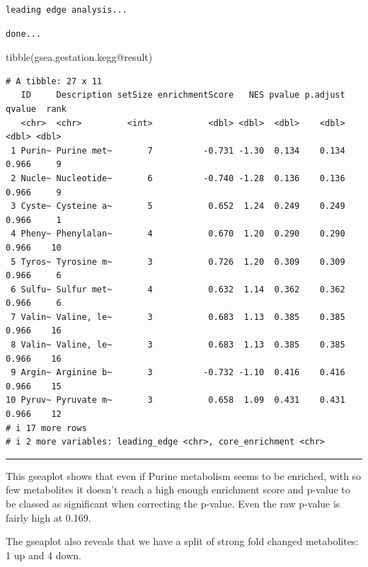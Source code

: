\documentclass[
  24px,
  letterpaper,
  DIV=11,
  numbers=noendperiod]{scrartcl}
\newenvironment{Shaded}{\begin{snugshade}}{\end{snugshade}}
\newcommand{\AttributeTok}[1]{\textcolor[rgb]{0.40,0.45,0.13}{#1}}
\newcommand{\DecValTok}[1]{\textcolor[rgb]{0.68,0.00,0.00}{#1}}
\newcommand{\FunctionTok}[1]{\textcolor[rgb]{0.28,0.35,0.67}{#1}}
\newcommand{\NormalTok}[1]{\textcolor[rgb]{0.00,0.23,0.31}{#1}}
\newcommand{\SpecialCharTok}[1]{\textcolor[rgb]{0.37,0.37,0.37}{#1}}
\begin{document}
\begin{verbatim}
leading edge analysis...
\end{verbatim}

\begin{verbatim}
done...
\end{verbatim}

\begin{Shaded}
\begin{Highlighting}[]
\FunctionTok{tibble}\NormalTok{(gsea.gestation.kegg}\SpecialCharTok{@}\NormalTok{result)}
\end{Highlighting}
\end{Shaded}

\begin{verbatim}
# A tibble: 27 x 11
   ID     Description setSize enrichmentScore   NES pvalue p.adjust qvalue  rank
   <chr>  <chr>         <int>           <dbl> <dbl>  <dbl>    <dbl>  <dbl> <dbl>
 1 Purin~ Purine met~       7          -0.731 -1.30  0.134    0.134  0.966     9
 2 Nucle~ Nucleotide~       6          -0.740 -1.28  0.136    0.136  0.966     9
 3 Cyste~ Cysteine a~       5           0.652  1.24  0.249    0.249  0.966     1
 4 Pheny~ Phenylalan~       4           0.670  1.20  0.290    0.290  0.966    10
 5 Tyros~ Tyrosine m~       3           0.726  1.20  0.309    0.309  0.966     6
 6 Sulfu~ Sulfur met~       4           0.632  1.14  0.362    0.362  0.966     6
 7 Valin~ Valine, le~       3           0.683  1.13  0.385    0.385  0.966    16
 8 Valin~ Valine, le~       3           0.683  1.13  0.385    0.385  0.966    16
 9 Argin~ Arginine b~       3          -0.732 -1.10  0.416    0.416  0.966    15
10 Pyruv~ Pyruvate m~       3           0.658  1.09  0.431    0.431  0.966    12
# i 17 more rows
# i 2 more variables: leading_edge <chr>, core_enrichment <chr>
\end{verbatim}

\begin{center}\rule{0.5\linewidth}{0.5pt}\end{center}

This gseaplot shows that even if Purine metabolism seems to be enriched,
with so few metabolites it doesn't reach a high enough enrichment score
and p-value to be classed as significant when correcting the p-value.
Even the raw p-value is fairly high at 0.169.

The gseaplot also reveals that we have a split of strong fold changed
metabolites: 1 up and 4 down.

\begin{Shaded}
\end{Shaded}
\end{document}
